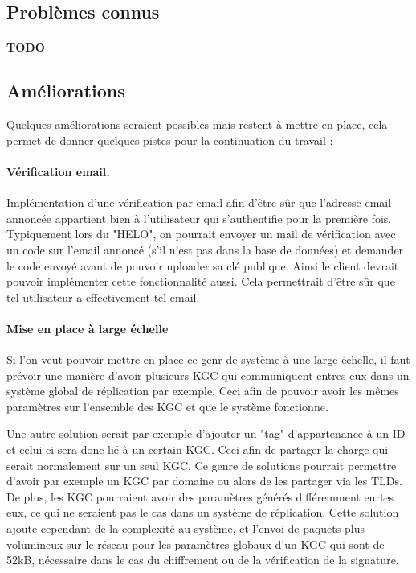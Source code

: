 \subsection{Problèmes connus}
\paragraph*{TODO}

\subsection{Améliorations}
Quelques améliorations seraient possibles mais restent à mettre en place, cela permet de donner quelques pistes pour la continuation du travail :
\paragraph*{Vérification email.}
Implémentation d'une vérification par email afin d'être sûr que l'adresse email annoncée appartient bien à l'utilisateur qui s'authentifie pour la première fois. Typiquement lors du "HELO", on pourrait envoyer un mail de vérification avec un code sur l'email annoncé (s'il n'est pas dans la base de données) et demander le code envoyé avant de pouvoir uploader sa clé publique. Ainsi le client devrait pouvoir implémenter cette fonctionnalité aussi. Cela permettrait d'être sûr que tel utilisateur a effectivement tel email.
\paragraph*{Mise en place à large échelle}
Si l'on veut pouvoir mettre en place ce genr de système à une large échelle, il faut prévoir une manière d'avoir plusieurs KGC qui communiquent entres eux dans un système global de réplication par exemple. Ceci afin de pouvoir avoir les mêmes paramètres sur l'ensemble des KGC et que le système fonctionne.

Une autre solution serait par exemple d'ajouter un "tag" d'appartenance à un ID et celui-ci sera donc lié à un certain KGC. Ceci afin de partager la charge qui serait normalement sur un seul KGC. Ce genre de solutions pourrait permettre d'avoir par exemple un KGC par domaine ou alors de les partager via les TLDs. De plus, les KGC pourraient avoir des paramètres générés différemment enrtes eux, ce qui ne seraient pas le cas dans un système de réplication. Cette solution ajoute cependant de la complexité au système, et l'envoi de paquets plus volumineux sur le réseau pour les paramètres globaux d'un KGC qui sont de 52kB, nécessaire dans le cas du chiffrement ou de la vérification de la signature.

